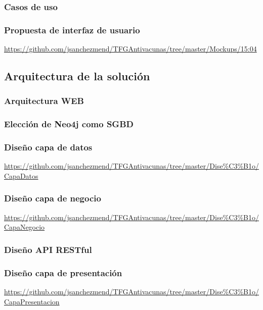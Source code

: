 \documentclass[11pt,a4paper]{article}
\begin{document}
\subsubsection{Casos de uso}
\medskip 

\subsubsection{Propuesta de interfaz de usuario}
\url{https://github.com/jsanchezmend/TFGAntivacunas/tree/master/Mockups/15:04}
\medskip 


\subsection{Arquitectura de la solución}
\medskip 

\subsubsection{Arquitectura WEB}
\medskip 

\subsubsection{Elección de Neo4j como SGBD}
\medskip 

\subsubsection{Diseño capa de datos}
\url{https://github.com/jsanchezmend/TFGAntivacunas/tree/master/Dise%C3%B1o/CapaDatos}
\medskip 

\subsubsection{Diseño capa de negocio}
\url{https://github.com/jsanchezmend/TFGAntivacunas/tree/master/Dise%C3%B1o/CapaNegocio}
\medskip 

\subsubsection{Diseño API RESTful}
\medskip 

\subsubsection{Diseño capa de presentación}
\url{https://github.com/jsanchezmend/TFGAntivacunas/tree/master/Dise%C3%B1o/CapaPresentacion}
\newpage 
\end{document}

